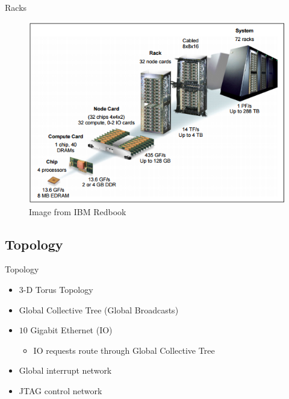\documentclass{beamer}
\begin{document}
\begin{frame}{Racks}
\begin{figure}
\begin{center}
\includegraphics[scale=0.5]{figs/racks.png}
\caption{Image from IBM Redbook \cite{ibm}}
\end{center}
\end{figure}
\end{frame}

\subsection{Topology}
\begin{frame}{Topology}
\begin{itemize}
\item $3$-D Torus Topology
\item Global Collective Tree (Global Broadcasts)
\item $10$ Gigabit Ethernet (IO)
    \begin{itemize}
        \item IO requests route through Global Collective Tree
    \end{itemize}
\item Global interrupt network
\item JTAG control network
\end{itemize}
\end{frame}
\end{document}
